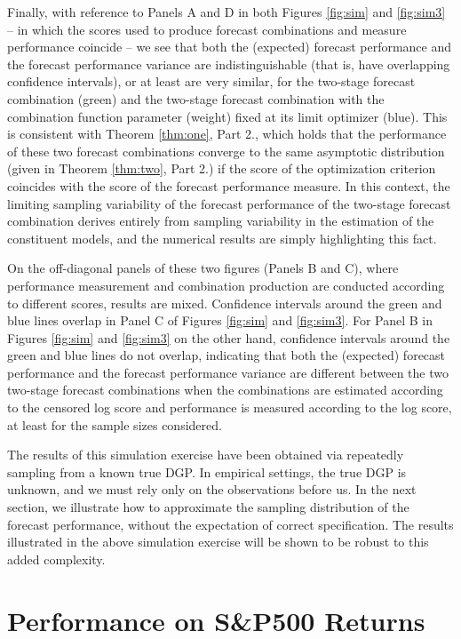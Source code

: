 \documentclass[12pt]{article}
\theoremstyle{definition}
\theoremstyle{remark}
\begin{document}
Finally, with reference to Panels A and D in both Figures \ref{fig:sim} and \ref{fig:sim3} -- in which the scores used to produce forecast combinations and measure performance coincide -- we see that both the (expected) forecast performance and the forecast performance variance are indistinguishable (that is, have overlapping confidence intervals), or at least are very similar, for the two-stage forecast combination (green) and the two-stage forecast combination with the combination function parameter (weight) fixed at its limit optimizer (blue). This is consistent with Theorem \ref{thm:one}, Part 2., which holds that the performance of these two forecast combinations converge to the same asymptotic distribution (given in Theorem \ref{thm:two}, Part 2.) if the score of the optimization criterion coincides with the score of the forecast performance measure. In this context, the limiting sampling variability of the forecast performance of the two-stage forecast combination derives entirely from sampling variability in the estimation of the constituent models, and the numerical results are simply highlighting this fact.

On the off-diagonal panels of these two figures (Panels B and C), where performance measurement and combination production are conducted according to different scores, results are mixed. Confidence intervals around the green and blue lines overlap in Panel C of Figures \ref{fig:sim} and \ref{fig:sim3}. For Panel B in Figures \ref{fig:sim} and \ref{fig:sim3} on the other hand, confidence intervals around the green and blue lines do not overlap, indicating that both the (expected) forecast performance and the forecast performance variance are different between the two two-stage forecast combinations when the combinations are estimated according to the censored log score and performance is measured according to the log score, at least for the sample sizes considered.

The results of this simulation exercise have been obtained via repeatedly sampling from a known true DGP. In empirical settings, the true DGP is unknown, and we must rely only on the observations before us. In the next section, we illustrate how to approximate the sampling distribution of the forecast performance, without the expectation of correct specification. The results illustrated in the above simulation exercise will be shown to be robust to this added complexity.

\section{Performance on S\&P500 Returns\label{sec:emp}}
\end{document}
